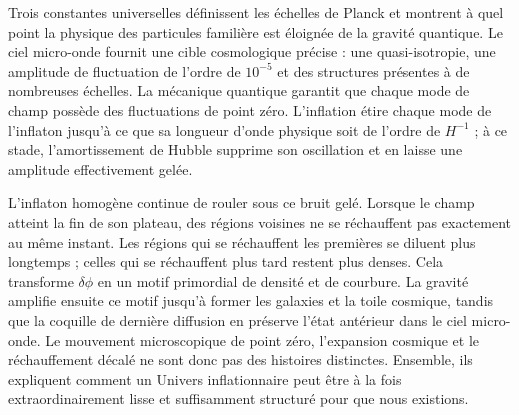 Trois constantes universelles définissent les échelles de Planck et montrent à quel point la physique des particules familière est éloignée de la gravité quantique. Le ciel micro-onde fournit une cible cosmologique précise : une quasi-isotropie, une amplitude de fluctuation de l’ordre de \(10^{-5}\) et des structures présentes à de nombreuses échelles. La mécanique quantique garantit que chaque mode de champ possède des fluctuations de point zéro. L’inflation étire chaque mode de l’inflaton jusqu’à ce que sa longueur d’onde physique soit de l’ordre de \(H^{-1}\) ; à ce stade, l’amortissement de Hubble supprime son oscillation et en laisse une amplitude effectivement gelée.

L’inflaton homogène continue de rouler sous ce bruit gelé. Lorsque le champ atteint la fin de son plateau, des régions voisines ne se réchauffent pas exactement au même instant. Les régions qui se réchauffent les premières se diluent plus longtemps ; celles qui se réchauffent plus tard restent plus denses. Cela transforme \(\delta\phi\) en un motif primordial de densité et de courbure. La gravité amplifie ensuite ce motif jusqu’à former les galaxies et la toile cosmique, tandis que la coquille de dernière diffusion en préserve l’état antérieur dans le ciel micro-onde. Le mouvement microscopique de point zéro, l’expansion cosmique et le réchauffement décalé ne sont donc pas des histoires distinctes. Ensemble, ils expliquent comment un Univers inflationnaire peut être à la fois extraordinairement lisse et suffisamment structuré pour que nous existions.
